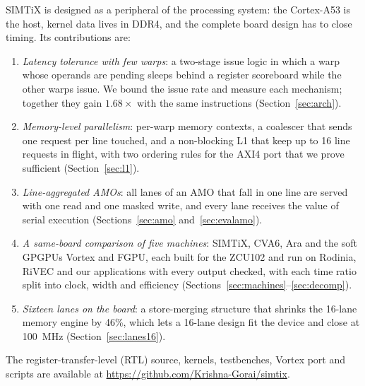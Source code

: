\documentclass[journal]{IEEEtran}
\begin{document}
SIMTiX is designed as a peripheral of the processing system: the Cortex-A53 is the
host, kernel data lives in DDR4, and the complete board design has to close timing.
Its contributions are:
\begin{enumerate}
\item \emph{Latency tolerance with few warps}: a two-stage issue logic in which a warp
whose operands are pending sleeps behind a register scoreboard while the other warps
issue. We bound the issue rate and measure each mechanism; together they gain
$1.68\times$ with the same instructions (Section~\ref{sec:arch}).
\item \emph{Memory-level parallelism}: per-warp memory contexts, a coalescer that sends
one request per line touched, and a non-blocking L1 that keep up to 16 line requests
in flight, with two ordering rules for the AXI4 port that we prove sufficient
(Section~\ref{sec:l1}).
\item \emph{Line-aggregated AMOs}: all lanes of an AMO that fall in one line are served
with one read and one masked write, and every lane receives the value of serial
execution (Sections~\ref{sec:amo} and~\ref{sec:evalamo}).
\item \emph{A same-board comparison of five machines}: SIMTiX, CVA6, Ara and the soft
GPGPUs Vortex and FGPU, each built for the ZCU102 and run on Rodinia, RiVEC and our
applications with every output checked, with each time ratio split into clock, width
and efficiency (Sections~\ref{sec:machines}--\ref{sec:decomp}).
\item \emph{Sixteen lanes on the board}: a store-merging structure that shrinks the
16-lane memory engine by 46\%, which lets a 16-lane design fit the device and close at
100~MHz (Section~\ref{sec:lanes16}).
\end{enumerate}
The register-transfer-level (RTL) source, kernels, testbenches, Vortex port and
scripts are available at \url{https://github.com/Krishna-Gorai/simtix}.

\end{document}
